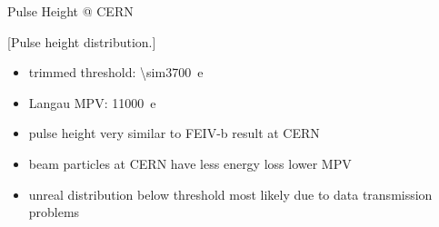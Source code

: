 \begin{frame}{Pulse Height @ CERN}

	\vspace*{-2ex}[Pulse height distribution.]\vspace*{-2ex}
	
	\begin{itemize}\itemfill
		\item trimmed threshold: \SI{\sim3700}{e}
		\item Langau MPV: \SI{11000}{e}
		\item pulse height very similar to FEIV-b result at CERN
		\item beam particles at CERN have less energy loss \ra lower MPV
		\item unreal distribution below threshold most likely due to data transmission problems
	\end{itemize}
	
\end{frame}
